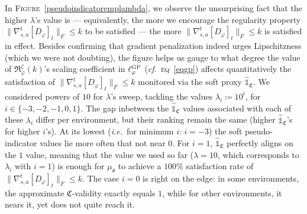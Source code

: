In \textsc{Figure}~\ref{pseudoindicatoremplambda}, we observe the unsurprising fact that
the higher $\lambda$'s value is --- equivalently, the more we encourage the regularity property
$\lVert \nabla_{s,a}^t[D_\varphi]_t \rVert _F \leq k$ to be satisfied ---
the more $\lVert \nabla_{s,a}^t[D_\varphi]_t \rVert _F \leq k$ is satisfied in effect.
Besides confirming that gradient penalization indeed urges Lipschitzness (which we were not doubting),
the figure helps us gauge to what degree the value of $\mathfrak{R}_\varphi^\zeta (k)$'s scaling coefficient
in $\ell_\varphi^\textsc{GP}$ (\textit{cf.}~\textsc{eq}~\ref{eqgp})
affects quantitatively the satisfaction of $\lVert \nabla_{s,a}^t[D_\varphi]_t \rVert _F \leq k$
monitored via the soft proxy $\widehat{\mathds{1}}_\mathfrak{C}$.
We considered powers of $10$ for $\lambda$'s sweep, tackling the values $\lambda_i \coloneqq 10^i$,
for $i \in \{-3, -2, -1, 0, 1\}$.
The gap inbetween the $\widehat{\mathds{1}}_\mathfrak{C}$ values associated with each of these $\lambda_i$
differ per environment, but their ranking remain the same (higher $\widehat{\mathds{1}}_\mathfrak{C}$'s
for higher $i$'s).
At its lowest (\textit{i.e.}~for minimum $i$: $i=-3$) the soft pseudo-indicator values
lie more often that not near $0$. For $i = 1$, $\widehat{\mathds{1}}_\mathfrak{C}$ perfectly aligns on the $1$ value,
meaning that the value we used so far ($\lambda=10$, which corresponds to $\lambda_i$ with $i=1$) is enough
for $\mu_\theta$ to achieve a $100\%$ satisfaction rate of $\lVert \nabla_{s,a}^t[D_\varphi]_t \rVert _F \leq k$.
The case $i = 0$ is right on the edge: in some environments, the approximate $\mathfrak{C}$-validity
exactly equals $1$, while for other environments, it nears it, yet does not quite reach it.

